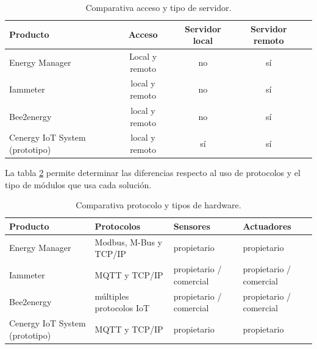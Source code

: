 \begin{table}[h]
	\centering
	\caption[Comparativa de soluciones entre acceso y servidor]{Comparativa acceso y tipo de servidor.}
	\begin{tabular}{p{4cm} c c c c }    
		\toprule
		\textbf{Producto} & \textbf{Acceso} & \textbf{Servidor local}   & \textbf{Servidor remoto} \\
		\midrule
		Energy Manager & Local y remoto  & no & sí  \\		
		Iammeter	 & local y remoto & no & sí  \\
		Bee2energy	 & local y remoto	& no & sí  \\
		\rowcolor[HTML]{ebedef}Cenergy IoT System (prototipo) & local y remoto & sí & sí \\
		\bottomrule
		\hline
	\end{tabular}
	\label{tab:tabla-resultado}
\end{table}


La tabla \ref{tab:tabla-resultado2} permite determinar las diferencias respecto al uso de protocolos y el tipo de módulos que usa cada solución. 


\begin{table}[h]
	\centering
	\caption[Comparativa de soluciones entre protocolo y hardware]{Comparativa protocolo y tipos de hardware.}
	\begin{tabular}{p{4cm} p{3cm} p{2cm} p{2cm}}    
		\toprule
		\textbf{Producto} 	 & \textbf{Protocolos}  & \textbf{Sensores} & \textbf{Actuadores}  \\
		\midrule
		Energy Manager & Modbus, M-Bus y TCP/IP & propietario & propietario \\		
		Iammeter	 & MQTT y TCP/IP	& propietario / comercial & propietario / comercial   \\
		Bee2energy	 & múltiples protocolos IoT		& propietario / comercial & propietario / comercial \\
		\rowcolor[HTML]{ebedef}Cenergy IoT	System (prototipo) & MQTT y TCP/IP	& propietario & propietario  \\
		\bottomrule
		\hline
	\end{tabular}
	\label{tab:tabla-resultado2}
\end{table}
